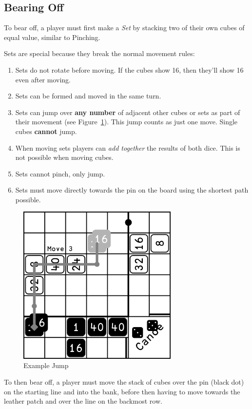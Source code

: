 \subsection{Bearing Off}\label{sec:bearing-off}
To bear off, a player must first make a \textit{Set} by stacking two of their own cubes of equal value, similar to Pinching.

Sets are special because they break the normal movement rules:
\begin{enumerate}
    \item Sets do not rotate before moving. If the cubes show 16, then they'll show 16 even after moving.
    \item Sets can be formed and moved in the same turn.
    \item Sets can jump over \textbf{any number} of adjacent other cubes or sets as part of their movement (see Figure~\ref{fig:jump}). This jump counts as just one move. Single cubes \textbf{cannot} jump.
    \item When moving sets players can \textit{add together} the results of both dice. This is not possible when moving cubes.
    \item Sets cannot pinch, only jump.
    \item Sets must move directly towards the pin on the board using the shortest path possible.
\end{enumerate}
\begin{figure}[!h]
    \centering
    \includegraphics[width=8cm]{../graphics/jump}
    \caption{Example Jump}
    \label{fig:jump}
\end{figure}
To then bear off, a player must move the stack of cubes over the pin (black dot) on the starting line and into the bank, before then having to move towards the leather patch and over the line on the backmost row.

